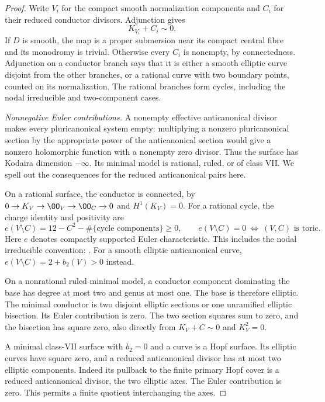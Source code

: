 \begin{proof}
Write $V_i$ for the compact smooth normalization
components and $C_i$ for their reduced conductor divisors.
Adjunction gives
\[
 K_{V_i}+C_i\sim0.                                  \tag{B.4.28.2}
\]
If $D$ is smooth, the map is a proper submersion near
its compact central fibre and its monodromy is trivial.
Otherwise every $C_i$ is nonempty, by connectedness.
Adjunction on a conductor branch says that it is either
a smooth elliptic curve disjoint from the other branches,
or a rational curve with two boundary points, counted
on its normalization. The rational branches form cycles,
including the nodal irreducible and two-component cases.

\emph{Nonnegative Euler contributions.}
A nonempty effective anticanonical divisor makes every
pluricanonical system empty: multiplying a nonzero
pluricanonical section by the appropriate power of the
anticanonical section would give a nonzero holomorphic
function with a nonempty zero divisor. Thus the surface
has Kodaira dimension $-\infty$. Its minimal model is
rational, ruled, or of class VII. We spell out the
consequences for the reduced anticanonical pairs here.

On a rational surface, the conductor is connected, by
$0\to K_V\to\OO_V\to\OO_C\to0$ and $H^1(K_V)=0$.
For a rational cycle, the charge identity and positivity
are
\[
 e(V\setminus C)=12-C^2-\#\{\text{cycle components}\}
 \ge0,\qquad
 e(V\setminus C)=0\ \Longleftrightarrow\ (V,C)
 \text{ is toric}.                                  \tag{B.4.28.3}
\]
Here $e$ denotes compactly supported Euler characteristic.
This includes the nodal irreducible convention:
\citet[Definition 1.1 and Lemmas 1.2, 2.2, 2.7]{Friedman2016AB}.
For a smooth elliptic anticanonical curve,
$e(V\setminus C)=2+b_2(V)>0$ instead.

On a nonrational ruled minimal model, a conductor
component dominating the base has degree at most two
and genus at most one. The base is therefore elliptic.
The minimal conductor is two disjoint elliptic sections
or one unramified elliptic bisection. Its Euler
contribution is zero. The two section squares sum to
zero, and the bisection has square zero, also directly
from $K_V+C\sim0$ and $K_V^2=0$.

A minimal class-VII surface with $b_2=0$ and a curve is
a Hopf surface. Its elliptic curves have square zero,
and a reduced anticanonical divisor has at most two
elliptic components. Indeed its pullback to the finite
primary Hopf cover is a reduced anticanonical divisor,
the two elliptic axes. The Euler contribution is zero.
This permits a finite quotient interchanging the axes.


\end{proof}
